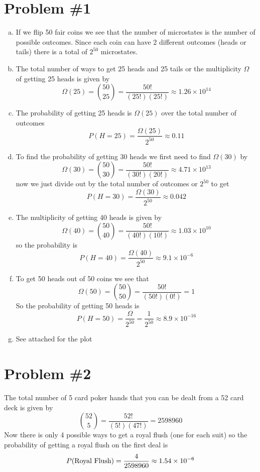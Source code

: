 \documentclass[11pt]{article}
\numberwithin{equation}{section}
\begin{document}


\section{Problem \#1}
\begin{enumerate}[(a)]
\item
If we flip 50 fair coins we see that the number of microstates is the number of possible outcomes. Since each coin can have 2 different outcomes (heads or tails) there is a total of $2^{50}$ microstates.

\item
The total number of ways to get 25 heads and 25 tails or the multiplicity $\Omega$ of getting 25 heads is given by
$$\Omega(25)={50\choose25} = \frac{50!}{(25!)(25!)}\approx 1.26\times10^{14}$$

\item
The probability of getting 25 heads is $\Omega(25)$ over the total number of outcomes 
$$P(H=25) = \frac{\Omega(25)}{2^{50}} \approx 0.11$$

\item
To find the probability of getting 30 heads we first need to find $\Omega(30)$ by
$$\Omega(30) = {50\choose30} =\frac{50!}{(30!)(20!)}\approx 4.71\times10^{13}$$
now we just divide out by the total number of outcomes or $2^{50}$ to get
$$P(H=30) = \frac{\Omega(30)}{2^{50}} \approx 0.042$$ 

\item
The multiplicity of getting 40 heads is given by
$$\Omega(40) = {50\choose40} =\frac{50!}{(40!)(10!)}\approx 1.03\times10^{10}$$
so the probability is 
$$P(H=40) = \frac{\Omega(40)}{2^{50}} \approx 9.1\times10^{-6}$$

\item
To get 50 heads out of 50 coins we see that
$$\Omega(50) = {50\choose50} = \frac{50!}{(50!)(0!)} = 1$$
So the probability of getting 50 heads is
$$P(H=50) = \frac{\Omega}{2^{50}} = \frac{1}{2^{50}} \approx 8.9\times10^{-16}$$

\item
See attached for the plot
\end{enumerate}

\section{Problem \#2}
The total number of 5 card poker hands that you can be dealt from a 52 card deck is given by
$${52\choose5} = \frac{52!}{(5!)(47!)} = 2598960$$
Now there is only 4 possible ways to get a royal flush (one for each suit) so the probability of getting a royal flush on the first deal is
$$P(\textnormal{Royal Flush}) = \frac{4}{2598960} \approx 1.54\times10^{-6}$$
\end{document}
